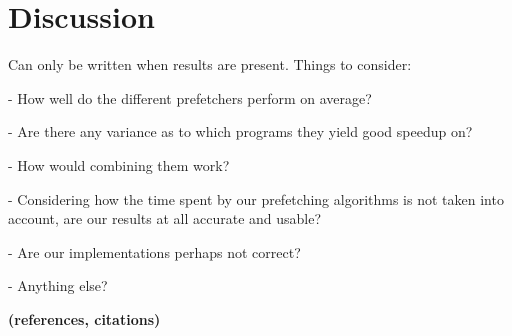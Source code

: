
\section{Discussion} %
\label{sec:discussion}

Can only be written when results are present.
Things to consider:

- How well do the different prefetchers perform on average?

- Are there any variance as to which programs they yield good speedup
on?

- How would combining them work?

- Considering how the time spent by our prefetching algorithms is not
taken into account, are our results at all accurate and usable?

- Are our implementations perhaps not correct?

- Anything else?

{\bf (references, citations)}
